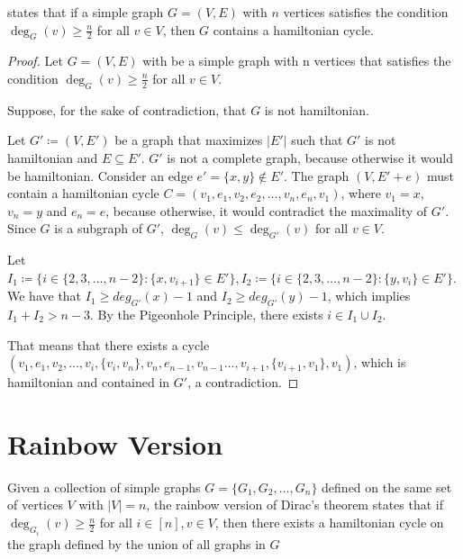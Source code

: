 \cite{dirac1952} states that if a simple graph $G = (V, E)$ with $n$ vertices satisfies the condition $\deg_G(v) \geq \frac{n}{2}$ for all $v \in V$, 
then $G$ contains a hamiltonian cycle.

\begin{proof}
    Let $G = (V, E)$ with be a simple graph with n vertices that satisfies the condition $\deg_G(v) \geq \frac{n}{2}$ for all $v \in V$.

    Suppose, for the sake of contradiction, that $G$ is not hamiltonian. 

    Let $G' \coloneqq (V, E')$ be a graph that maximizes $|E'|$ such that $G'$ is not hamiltonian and $E \subseteq E'$. 
    $G'$ is not a complete graph, because otherwise it would be hamiltonian. Consider an edge $e' = \{x, y\} \not\in E'$.
    The graph $(V, E' + e)$ must contain a hamiltonian cycle $C = (v_1, e_1, v_2, e_2, \ldots, v_n, e_{n}, v_1)$, where 
    $v_1 = x$, $v_n = y$ and $e_n = e$, because otherwise, it would contradict the maximality of $G'$.
    Since $G$ is a subgraph of $G'$, $\deg_G(v) \leq \deg_{G'}(v)$ for all $v \in V$.

    Let $I_1 \coloneqq \{i \in \{2, 3, \dots, n-2\} : \{x, v_{i+1}\} \in E'\}, 
    I_2 \coloneqq \{ i \in \{2, 3, \dots, n - 2\} : \{y, v_{i}\} \in E' \}$.
    We have that $I_1 \geq deg_{G'}(x) - 1$ and $I_2 \geq deg_{G'}(y) - 1$,
    which implies $I_1 + I_2 > n - 3$. By the Pigeonhole Principle, there exists $i \in I_1 \cup I_2$.

    That means that there exists a cycle 
    $(v_1, e_1, v_2, \dots, v_i, \{v_i, v_n\}, v_n, e_{n - 1}, v_{n-1} \dots , v_{i+1}, \{v_{i+1}, v_1\}, v_1)$, which is hamiltonian and contained in $G'$, a contradiction.

\end{proof}

\section{Rainbow Version}

Given a collection of simple graphs $G = \{G_1, G_2, \ldots, G_n\}$ defined on the same set of vertices $V$ with $|V| = n$,
the rainbow version of Dirac's theorem states that if $\deg_{G_i}(v) \geq \frac{n}{2}$ for all $i \in [n], v \in V$, 
then there exists a hamiltonian cycle on the graph defined by the union of all graphs in $G$
